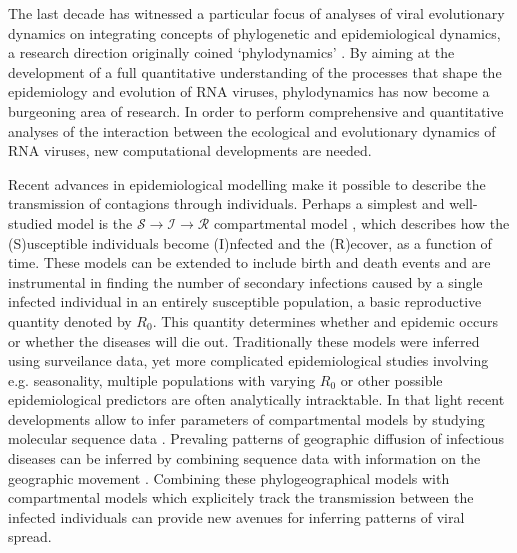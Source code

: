 The last decade has witnessed a particular focus of analyses of viral evolutionary dynamics on integrating concepts of phylogenetic and epidemiological dynamics, a research direction originally coined `phylodynamics' \citep{Grenfell2004}.
By aiming at the development of a full quantitative understanding of the processes that shape the epidemiology and evolution of RNA viruses,
phylodynamics has now become a burgeoning area of research.
In order to perform comprehensive and quantitative analyses of the interaction between the ecological and evolutionary dynamics of RNA viruses, new computational developments are needed.

Recent advances in epidemiological modelling make it possible to describe the transmission of contagions through individuals.
Perhaps a simplest and well-studied model is the ${\mathcal{S} \rightarrow \mathcal{I} \rightarrow \mathcal{R}}$  compartmental model %
, which describes how the (S)usceptible individuals become (I)nfected and the (R)ecover, as a function of time.  
These models can be extended to include birth and death events %
and are instrumental in finding the number of secondary infections caused by a single infected individual in an entirely susceptible population, a basic reproductive quantity denoted by $R_{0}$.
This quantity determines whether and epidemic occurs or whether the diseases will die out.
Traditionally these models were inferred using surveilance data, yet more complicated epidemiological studies involving e.g. seasonality, multiple populations with varying $R_0$ or other possible epidemiological predictors are often analytically intracktable.
In that light recent developments allow to infer parameters of compartmental models by studying molecular sequence data \citep{Volz2009}.
Prevaling patterns of geographic diffusion of infectious diseases can be inferred by combining sequence data with information on the geographic movement \citep{Lemey2009}.
Combining these phylogeographical models with compartmental models which explicitely track the transmission between the infected individuals can provide new avenues for inferring patterns of viral spread.

